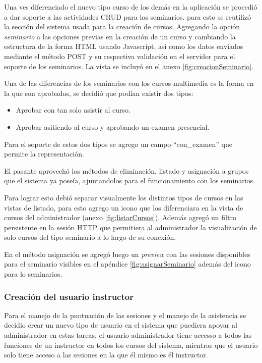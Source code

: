 Una ves diferenciado el nuevo tipo curso de los demás en la aplicación se procedió a dar soporte a las actividades CRUD para los seminarios. para esto se reutilizó la sección del sistema usada para la creación de cursos. Agregando la opción \emph{seminario} a las opciones previas en la creación de un curso y cambiando la estructura de la forma HTML usando Javascript, asi como los datos enviados mediante el método POST y su respectiva validación en el servidor para el soporte de los seminarios. La vista se incluyó en el anexo \ref{fig:creacionSeminario}.

Una de las diferencias de los seminarios con los cursos multimedia es la forma en la que son aprobados, se decidió que podían existir dos tipos:

\begin{itemize}
	\item Aprobar con tan solo asistir al curso.
	\item Aprobar asitiendo al curso y aprobando un examen presencial.
\end{itemize}

Para el soporte de estos dos tipos se agrego un campo ``con\_examen'' que permite la representación.

El pasante aprovechó los métodos de eliminación, listado y asignación a grupos que el sistema ya poseía, ajuntandolos para el funcionamiento con los seminarios. 

Para lograr esto debió separar visualmente los distintos tipos de cursos en las vistas de listado, para esto agrego un icono que los diferenciara en la vista de cursos del administrador (anexo \ref{fig:listarCursos}). Además agregó un filtro persistente en la sesión HTTP que permitiera al administrador la visualización de solo cursos del tipo seminario a lo largo de su conexión.

En el método asignación se agregó luego un \emph{preview} con las sesiones disponibles para el seminario visibles en el apéndice \ref{fig:asignarSeminario} además del icono para lo seminarios. 


\subsubsection{Creación del usuario instructor}

Para el manejo de la puntuación de las sesiones y el manejo de la asistencia se decidio crear un nuevo tipo de usuario en el sistema que puediera apoyar al administrador en estas tareas. el usuario administrador tiene accesso a todos las funciones de un instructor en todos los cursos del sistema, mientras que el usuario solo tiene acceso a las sesiones en la que él mismo es él instructor.

